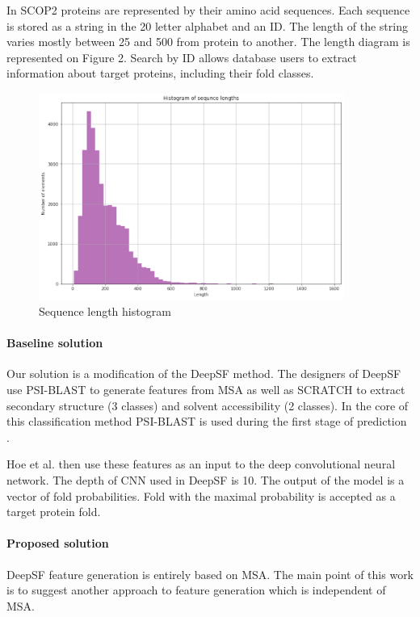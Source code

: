 \documentclass[12pt, twoside]{article}
\begin{document}
In SCOP2 proteins are represented by their amino acid sequences. Each sequence is stored as a string in the 20 letter alphabet and an ID. The length of the string varies mostly between 25 and 500 from protein to another. The length diagram is represented on Figure 2. Search by ID allows database users to extract information about target proteins, including their fold classes. 

\begin{figure}[htp]
    \centering
    \includegraphics[width=10cm]{figures/figure4.pdf}
    \caption{Sequence length histogram}
\end{figure}

\paragraph{Baseline solution}
\noindent
Our solution is a modification of the DeepSF \cite{DeepSF} method. The designers of DeepSF use PSI-BLAST\cite{PSIBLAST} to generate features from MSA  as well as SCRATCH \cite{SCRATCH} to extract secondary structure (3 classes) and solvent accessibility (2 classes).  In the core of this classification method PSI-BLAST is used during the first stage of prediction \cite{SCRATCH}. 

Hoe et al. then use these features as an input to the deep convolutional neural network. The depth of CNN used in DeepSF is 10. The output of the model is a vector of fold probabilities. Fold with the maximal probability is accepted as a target protein fold. 

\paragraph{Proposed solution}
\noindent

DeepSF feature generation is entirely based on MSA. The main point of this work is to suggest another approach to feature generation which is independent of MSA. 
\end{document}
